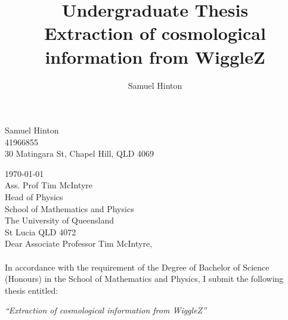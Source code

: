 \documentclass[titlesmallcaps, examinerscopy, copyrightpage]{uqthesis}
\begin{document}

\hypersetup{pageanchor=true}

\title{Undergraduate Thesis\\ \vspace{0.5 cm} Extraction of cosmological information from WiggleZ}
\author{Samuel Hinton}

\renewcommand{\degreetext}{in partial fulfilment of the Bachelor of Science (Honours) degree\\ in the
discipline of Physics}

\frontmatter

\titlepage




\begin{flushright}
Samuel Hinton\\ 41966855\\ 30 Matingara St, Chapel Hill, QLD 4069\\
\end{flushright}

\noindent \today \\
\noindent Ass. Prof Tim McIntyre\\
Head of Physics\\
School of Mathematics and Physics\\
The University of  Queensland\\
St Lucia QLD 4072\\

\noindent Dear Associate Professor Tim McIntyre,\\ \\
In accordance with the requirement of the Degree of Bachelor of Science (Honours) in the School of Mathematics and Physics, I submit the following thesis entitled:

\begin{center}
  \emph{``Extraction of cosmological information from WiggleZ''}
\end{center}
\end{document}
